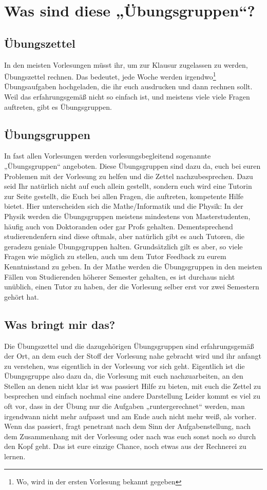 \section{Was sind diese „Übungsgruppen“?}

\subsection{Übungszettel}
In den meisten Vorlesungen müsst ihr, um zur Klausur zugelassen zu werden, Übungszettel rechnen. Das bedeutet, jede Woche werden irgendwo\footnote{Wo, wird in der ersten Vorlesung bekannt gegeben} Übungsaufgaben hochgeladen, die ihr euch ausdrucken und dann rechnen sollt. Weil das erfahrungsgemäß nicht so einfach ist, und meistens viele viele Fragen auftreten, gibt es Übungsgruppen.

\subsection{Übungsgruppen}
In fast allen Vorlesungen werden vorlesungsbegleitend sogenannte „Übungsgruppen“ angeboten. Diese Übungsgruppen sind dazu da, euch bei euren Problemen mit der Vorlesung zu helfen und die Zettel nachzubesprechen. Dazu seid Ihr natürlich nicht auf euch allein gestellt, sondern euch wird eine Tutorin zur Seite gestellt, die Euch bei allen Fragen, die auftreten, kompetente Hilfe bietet. Hier unterscheiden sich die Mathe/Informatik und die Physik: In der Physik werden die Übungsgruppen meistens mindestens von Masterstudenten, häufig auch von Doktoranden oder gar Profs gehalten. Dementsprechend studierendenfern sind diese oftmals, aber natürlich gibt es auch Tutoren, die geradezu geniale Übungsgruppen halten. Grundsätzlich gilt es aber, so viele Fragen wie möglich zu stellen, auch um dem Tutor Feedback zu eurem Kenntnisstand zu geben. In der Mathe werden die Übungsgruppen in den meisten Fällen von Studierenden höherer Semester gehalten, es ist durchaus nicht unüblich, einen Tutor zu haben, der die Vorlesung selber erst vor zwei Semestern gehört hat.

\subsection{Was bringt mir das?}
Die Übungszettel und die dazugehörigen Übungsgruppen sind erfahrungsgemäß der Ort, an dem euch der Stoff der Vorlesung nahe gebracht wird und ihr anfangt zu verstehen, was eigentlich in der Vorlesung vor sich geht. Eigentlich ist die Übungsgruppe also dazu da, die Vorlesung mit euch nachzuarbeiten, an den Stellen an denen nicht klar ist was passiert Hilfe zu bieten, mit euch die Zettel zu besprechen und einfach nochmal eine andere Darstellung Leider kommt es viel zu oft vor, dass in der Übung nur die Aufgaben „runtergerechnet“ werden, man irgendwann nicht mehr aufpasst und am Ende auch nicht mehr weiß, als vorher. Wenn das passiert, fragt penetrant nach dem Sinn der Aufgabenstellung, nach dem Zusammenhang mit der Vorlesung oder nach was euch sonst noch so durch den Kopf geht. Das ist eure einzige Chance, noch etwas aus der Rechnerei zu lernen.

